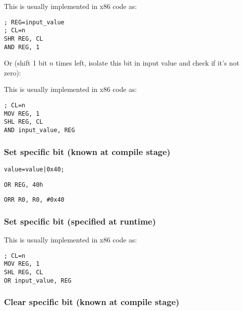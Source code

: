 This is usually implemented in x86 code as:

\begin{lstlisting}[caption=x86,style=customasmx86]
; REG=input_value
; CL=n
SHR REG, CL
AND REG, 1
\end{lstlisting}

Or (shift 1 bit $n$ times left, isolate this bit in input value and check if it's not zero):



This is usually implemented in x86 code as:

\begin{lstlisting}[caption=x86,style=customasmx86]
; CL=n
MOV REG, 1
SHL REG, CL
AND input_value, REG
\end{lstlisting}

\subsubsection{Set specific bit (known at compile stage)}

\begin{lstlisting}[caption=\CCpp]
value=value|0x40;
\end{lstlisting}

\begin{lstlisting}[caption=x86,style=customasmx86]
OR REG, 40h
\end{lstlisting}

\begin{lstlisting}[caption=ARM (\ARMMode) and ARM64,style=customasmARM]
ORR R0, R0, #0x40
\end{lstlisting}

\subsubsection{Set specific bit (specified at runtime)}



This is usually implemented in x86 code as:

\begin{lstlisting}[caption=x86,style=customasmx86]
; CL=n
MOV REG, 1
SHL REG, CL
OR input_value, REG
\end{lstlisting}

\subsubsection{Clear specific bit (known at compile stage)}

